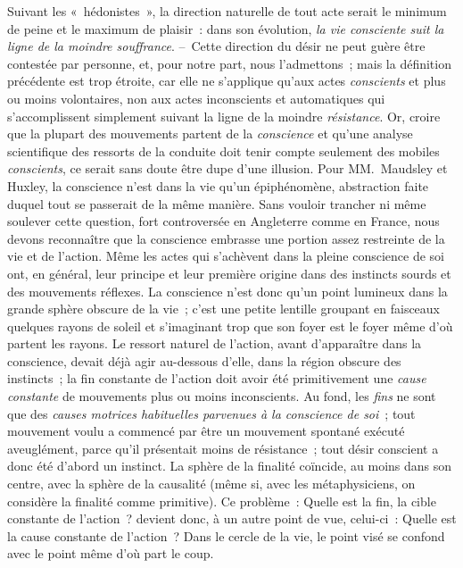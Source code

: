 \documentclass[french,twoside]{book} %
\begin{document}
Suivant les « hédonistes », la direction naturelle de tout acte serait le minimum de peine et le maximum de plaisir : dans son évolution, \emph{la vie consciente suit la ligne de la moindre souffrance}. – Cette direction du désir ne peut guère être contestée par personne, et, pour notre part, nous l’admettons ; mais la définition précédente est trop étroite, car elle ne s’applique qu’aux actes \emph{conscients} et plus ou moins volontaires, non aux actes inconscients et automatiques qui s’accomplissent simplement suivant la ligne de la moindre \emph{résistance}. Or, croire que la plupart des mouvements partent de la \emph{conscience} et qu’une analyse scientifique des ressorts de la conduite doit tenir compte seulement des mobiles \emph{conscients}, ce serait sans doute être dupe d’une illusion. Pour MM. Maudsley et Huxley, la conscience n’est dans la vie qu’un épiphénomène, abstraction faite duquel tout se passerait de la même manière. Sans vouloir trancher ni même soulever cette question, fort controversée en Angleterre comme en France, nous devons reconnaître que la conscience embrasse une portion assez restreinte de la vie et de l’action. Même les actes qui s’achèvent dans la pleine conscience de soi ont, en général, leur principe et leur première origine dans des instincts sourds et des mouvements réflexes. La conscience n’est donc qu’un point lumineux dans la grande sphère obscure de la vie ; c’est une petite lentille groupant en faisceaux quelques rayons de soleil et s’imaginant trop que son foyer est le foyer même d’où partent les rayons. Le ressort naturel de l’action, avant d’apparaître dans la conscience, devait déjà agir au-dessous d’elle, dans la région obscure des instincts ; la fin constante de l’action doit avoir été primitivement une \emph{cause constante} de mouvements plus ou moins inconscients. Au fond, les \emph{fins} ne sont que des \emph{causes motrices habituelles parvenues à la conscience de soi} ; tout mouvement voulu a commencé par être un mouvement spontané exécuté aveuglément, parce qu’il présentait moins de résistance ; tout désir conscient a donc été d’abord un instinct. La sphère de la finalité coïncide, au moins dans son centre, avec la sphère de la causalité (même si, avec les métaphysiciens, on considère la finalité comme primitive). Ce problème : Quelle est la fin, la cible constante de l’action ? devient donc, à un autre point de vue, celui-ci : Quelle est la cause constante de l’action ? Dans le cercle de la vie, le point visé se confond avec le point même d’où part le coup.\par
\end{document}
